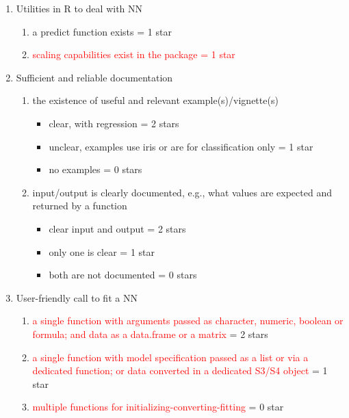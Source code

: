 \begin{enumerate}
\def\labelenumi{\arabic{enumi}.}
\tightlist
\item
  Utilities in \textsf{R} to deal with NN

  \begin{enumerate}
  \def\labelenumii{\alph{enumii}.}
  \tightlist
  \item
    a predict function exists = 1 star
  \item
    \textcolor{red}{scaling capabilities exist in the package = 1 star}
  \end{enumerate}
\item
  Sufficient and reliable documentation

  \begin{enumerate}
  \def\labelenumii{\alph{enumii}.}
  \tightlist
  \item
    the existence of useful and relevant example(s)/vignette(s)

    \begin{itemize}
    \tightlist
    \item
      clear, with regression = 2 stars
    \item
      unclear, examples use iris or are for classification only = 1 star
    \item
      no examples = 0 stars
    \end{itemize}
  \item
    input/output is clearly documented, e.g., what values are expected
    and returned by a function

    \begin{itemize}
    \tightlist
    \item
      clear input and output = 2 stars
    \item
      only one is clear = 1 star
    \item
      both are not documented = 0 stars
    \end{itemize}
  \end{enumerate}
\item
  User-friendly call to fit a NN

  \begin{enumerate}
  \def\labelenumii{\alph{enumii}.}
  \tightlist
  \item
    \textcolor{red}{a single function with arguments passed as character, numeric, boolean or formula; and data as a data.frame or a matrix}
    = 2 stars
  \item
    \textcolor{red}{a single function with model specification passed as a list or via a dedicated function; or data converted in a dedicated S3/S4 object}
    = 1 star
  \item
    \textcolor{red}{multiple functions for initializing-converting-fitting}
    = 0 star
  \end{enumerate}
\end{enumerate}

